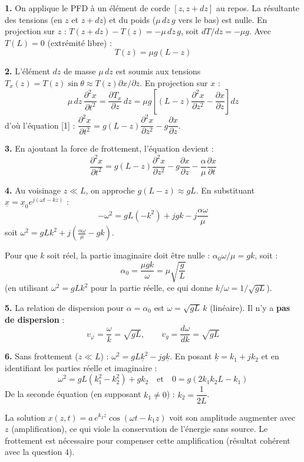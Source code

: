 \documentclass[12pt,a4paper]{article}
\begin{document}
\begin{boitecorrige}
\textbf{1.} On applique le PFD à un élément de corde $[z, z+dz]$ au repos. La résultante des tensions (en $z$ et $z+dz$) et du poids ($\mu\,dz\,g$ vers le bas) est nulle. En projection sur $z$ : $T(z+dz)-T(z) = -\mu\,dz\,g$, soit $dT/dz = -\mu g$. Avec $T(L)=0$ (extrémité libre) :
\[
T(z) = \mu g(L-z)
\]

\textbf{2.} L'élément $dz$ de masse $\mu\,dz$ est soumis aux tensions $T_x(z) = T(z)\sin\theta \approx T(z)\partial x/\partial z$. En projection sur $x$ :
\[
\mu\,dz\,\frac{\partial^2 x}{\partial t^2} = \frac{\partial T_x}{\partial z}\,dz = \mu g\left[(L-z)\frac{\partial^2 x}{\partial z^2} - \frac{\partial x}{\partial z}\right]dz
\]
d'où l'équation [1] : $\dfrac{\partial^2 x}{\partial t^2} = g(L-z)\dfrac{\partial^2 x}{\partial z^2} - g\dfrac{\partial x}{\partial z}$.

\textbf{3.} En ajoutant la force de frottement, l'équation devient :
\[
\frac{\partial^2 x}{\partial t^2} = g(L-z)\frac{\partial^2 x}{\partial z^2} - g\frac{\partial x}{\partial z} - \frac{\alpha}{\mu}\frac{\partial x}{\partial t}
\]

\textbf{4.} Au voisinage $z\ll L$, on approche $g(L-z)\approx gL$. En substituant $\underline{x}=\underline{x}_0 e^{j(\omega t-kz)}$ :
\[
-\omega^2 = gL(-k^2) + jgk - j\frac{\alpha\omega}{\mu}
\]
soit $\omega^2 = gLk^2 + j\!\left(\frac{\alpha\omega}{\mu} - gk\right)$.

Pour que $k$ soit réel, la partie imaginaire doit être nulle : $\alpha_0\omega/\mu = gk$, soit :
\[
\alpha_0 = \frac{\mu g k}{\omega} = \mu\sqrt{\frac{g}{L}}
\]
(en utilisant $\omega^2 = gLk^2$ pour la partie réelle, ce qui donne $k/\omega = 1/\sqrt{gL}$).

\textbf{5.} La relation de dispersion pour $\alpha=\alpha_0$ est $\omega = \sqrt{gL}\,k$ (linéaire). Il n'y a \textbf{pas de dispersion} :
\[
v_\varphi = \frac{\omega}{k} = \sqrt{gL}, \qquad v_g = \frac{d\omega}{dk} = \sqrt{gL}
\]

\textbf{6.} Sans frottement ($z\ll L$) : $\omega^2 = gL\underline{k}^2 - jg\underline{k}$. En posant $\underline{k}=k_1+jk_2$ et en identifiant les parties réelle et imaginaire :
\[
\omega^2 = gL(k_1^2-k_2^2)+gk_2 \quad\text{et}\quad 0 = g(2k_1k_2 L - k_1)
\]
De la seconde équation (en supposant $k_1\neq0$) : $k_2 = \dfrac{1}{2L}$.

La solution $x(z,t) = a\,e^{k_2 z}\cos(\omega t - k_1 z)$ voit son amplitude augmenter avec $z$ (amplification), ce qui viole la conservation de l'énergie sans source. Le frottement est nécessaire pour compenser cette amplification (résultat cohérent avec la question 4).


\end{boitecorrige}
\end{document}
